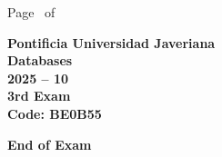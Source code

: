 \documentclass[11pt, addpoints, answers]{exam}\usepackage[utf8]{inputenc}
\begin{document}
\begin{coverpages}
\begin{center}
			\vspace{3mm}
			\leavevmode \hspace{5mm} 
		\end{center}
	\end{coverpages}

	\footer{} {Page \thepage\ of \numpages} {}

	\centering
	\textbf{\Large Pontificia Universidad Javeriana}\\
	\textbf{\Large Databases} \\
	\textbf{\large 2025 -- 10} \\
	\textbf{\large 3rd Exam} \\
	\textbf{Code: BE0B55}


	\begin{questions}
		
		
		
		
		
		
		
		
		
		
		
		
		
		
		
		
		
		
		
		
	\end{questions}

	\vspace{5mm}
	\noindent \textbf{End of Exam}
\end{document}

